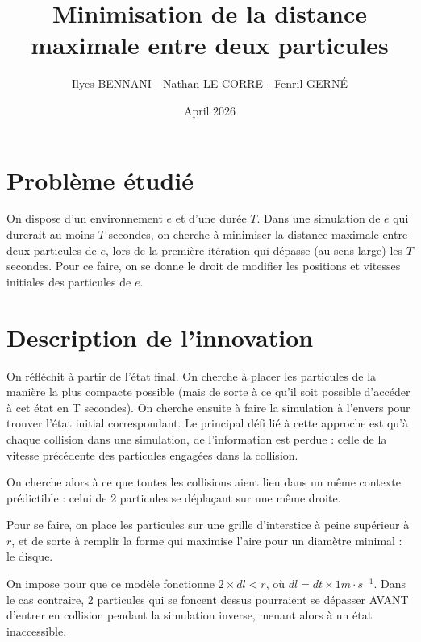 \documentclass{article}
\title{Minimisation de la distance maximale entre deux particules}
\author{Ilyes BENNANI - Nathan LE CORRE - Fenril GERNÉ}
\date{April 2026}
\begin{document}
\maketitle

\section{Problème étudié}

On dispose d'un environnement $e$ et d'une durée $T$. Dans une simulation de $e$ qui durerait au moins $T$ secondes, on cherche à minimiser la distance maximale entre deux particules de $e$, lors de la première itération qui dépasse (au sens large) les $T$ secondes.
Pour ce faire, on se donne le droit de modifier les positions et vitesses initiales des particules de $e$.

\section{Description de l'innovation}

On réfléchit à partir de l'état final. On cherche à placer les particules de la manière la plus compacte possible (mais de sorte à ce qu'il soit possible d'accéder à cet état en T secondes).
On cherche ensuite à faire la simulation à l'envers pour trouver l'état initial correspondant.
Le principal défi lié à cette approche est qu'à chaque collision dans une simulation, de l'information est perdue : celle de la vitesse précédente des particules engagées dans la collision.

On cherche alors à ce que toutes les collisions aient lieu dans un même contexte prédictible : celui de 2 particules se déplaçant sur une même droite.

Pour se faire, on place les particules sur une grille d'interstice à peine supérieur à $r$, et de sorte à remplir la forme qui maximise l'aire pour un diamètre minimal : le disque.

On impose pour que ce modèle fonctionne $2\times dl < r$, où $dl = dt\times 1m\cdot s^{-1}$. Dans le cas contraire, 2 particules qui se foncent dessus pourraient se dépasser AVANT d'entrer en collision pendant la simulation inverse, menant alors à un état inaccessible.
\end{document}
